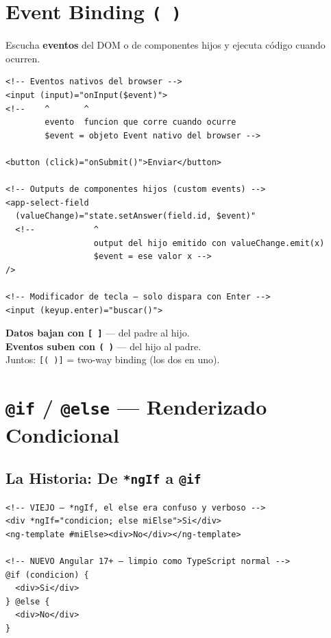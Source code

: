 \documentclass[12pt, a4paper]{article}
\begin{document}
\section{ Event Binding \texttt{( )}}

Escucha \textbf{eventos} del DOM o de componentes hijos y ejecuta
código cuando ocurren.

\begin{lstlisting}
<!-- Eventos nativos del browser -->
<input (input)="onInput($event)">
<!--    ^       ^
        evento  funcion que corre cuando ocurre
        $event = objeto Event nativo del browser -->

<button (click)="onSubmit()">Enviar</button>

<!-- Outputs de componentes hijos (custom events) -->
<app-select-field
  (valueChange)="state.setAnswer(field.id, $event)"
  <!--            ^
                  output del hijo emitido con valueChange.emit(x)
                  $event = ese valor x -->
/>

<!-- Modificador de tecla — solo dispara con Enter -->
<input (keyup.enter)="buscar()">
\end{lstlisting}

\begin{tcolorbox}[regla, title={\emoji{pushpin} La Regla de los Corchetes}]
  \textbf{Datos bajan con \texttt{[ ]}} --- del padre al hijo.\\
  \textbf{Eventos suben con \texttt{( )}} --- del hijo al padre.\\[0.3cm]
  Juntos: \texttt{[( )]} = two-way binding (los dos en uno).
\end{tcolorbox}

\section{ \texttt{@if} / \texttt{@else} --- Renderizado Condicional}

\subsection{La Historia: De \texttt{*ngIf} a \texttt{@if}}

\begin{lstlisting}
<!-- VIEJO — *ngIf, el else era confuso y verboso -->
<div *ngIf="condicion; else miElse">Si</div>
<ng-template #miElse><div>No</div></ng-template>

<!-- NUEVO Angular 17+ — limpio como TypeScript normal -->
@if (condicion) {
  <div>Si</div>
} @else {
  <div>No</div>
}
\end{lstlisting}
\end{document}
